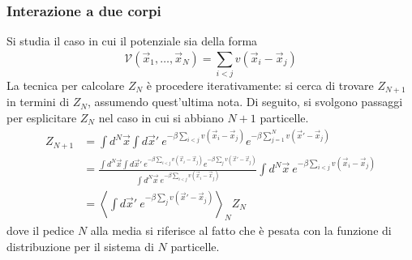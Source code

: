 \documentclass[11pt, a4paper]{scrartcl}
\theoremstyle{style}
\theoremstyle{style1}
\numberwithin{equation}{subsection}
\begin{document}
\subsubsection{Interazione a due corpi}
Si studia il caso in cui il potenziale sia della forma 
\[
\mathcal{V} (\vec{x}_1,\ldots,\vec{x}_N) = \sum_{i<j}^{} v (\vec{x}_i - \vec{x}_j)
\] 
La tecnica per calcolare $Z_N$ \`e procedere iterativamente: si cerca di trovare $Z_{N+1} $ in termini di $Z_N$, assumendo quest'ultima nota.
Di seguito, si svolgono passaggi per esplicitare $Z_N$ nel caso in cui si abbiano $N+1$ particelle.
\[
\begin{split}
	Z_{N+1} &= \int d^N \vec{x} \int d \vec{x}' \ e^{-\beta \sum_{i<j}^{} v(\vec{x}_i -\vec{x}_j)}  e^{-\beta \sum_{j=1}^{N} v(\vec{x}' - \vec{x}_j)} \\
		&= \frac{\displaystyle \int d^N \vec{x} \int d\vec{x}'\ e^{-\beta \sum_{i<j}^{} v(\vec{x}_i -\vec{x}_j)} e^{-\beta \sum_{j}^{} v(\vec{x}' -\vec{x}_j)}  }{\displaystyle \int d^N \vec{x} \ e^{-\beta \sum_{i<j}^{} v(\vec{x}_i-\vec{x}_j)} } \int d^N \vec{x} \ e^{-\beta \sum_{i<j}^{} v(\vec{x}_i - \vec{x}_j)} \\
		& = \left\langle \int d\vec{x}' \ e^{-\beta \sum_{j}^{} v(\vec{x}' - \vec{x}_j)}  \right\rangle_N Z_N
\end{split}
\] 
dove il pedice $N$ alla media si riferisce al fatto che \`e pesata con la funzione di distribuzione per il sistema di $N$ particelle.
\end{document}
